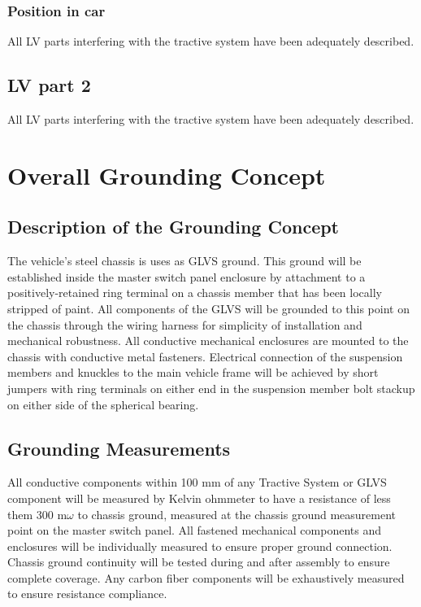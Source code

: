 \documentclass{article}
\begin{document}
\subsubsection{Position in car}
All LV parts interfering with the tractive system have been adequately described. 

\subsection{LV part 2}
All LV parts interfering with the tractive system have been adequately described. 

\section{Overall Grounding Concept}\label{overall_grounding_concept}
\subsection{Description of the Grounding Concept}
The vehicle's steel chassis is uses as GLVS ground. This ground will be established inside the master switch panel enclosure by attachment to a positively-retained ring terminal on a chassis member that has been locally stripped of paint. All components of the GLVS will be grounded to this point on the chassis through the wiring harness for simplicity of installation and mechanical robustness. All conductive mechanical enclosures are mounted to the chassis with conductive metal fasteners. Electrical connection of the suspension members and knuckles to the main vehicle frame will be achieved by short jumpers with ring terminals on either end in the suspension member bolt stackup on either side of the spherical bearing.


\subsection{Grounding Measurements}
All conductive components within 100 mm of any Tractive System or GLVS component will be measured by Kelvin ohmmeter to have a resistance of less them 300 m$\omega$ to chassis ground, measured at the chassis ground measurement point on the master switch panel. All fastened mechanical components and enclosures will be individually measured to ensure proper ground connection. Chassis ground continuity will be tested during and after assembly to ensure complete coverage. Any carbon fiber components will be exhaustively measured to ensure resistance compliance.
\end{document}
